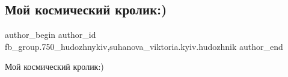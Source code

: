  
 
 
 
 

\subsection{Мой космический кролик:)}
\label{sec:04_04_2018.fb.fb_group.750_hudozhnykiv.2.moj_kosmicheskij_krolik}
 
\ifcmt
 author_begin
   author_id fb_group.750_hudozhnykiv,suhanova_viktoria.kyiv.hudozhnik
 author_end
\fi

Мой космический кролик:)


